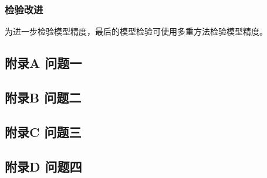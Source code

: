 \documentclass[a4paper, 12pt]{article}
\numberwithin{equation}{section}
\begin{document}
            \subsubsection{检验改进}
                为进一步检验模型精度，最后的模型检验可使用多重方法检验模型精度。


    {}
    \newpage


    {}
        \subsection*{附录A \hspace{2em} 问题一}
            

        \subsection*{附录B \hspace{2em} 问题二}
            

        \subsection*{附录C \hspace{2em} 问题三}
            

        \subsection*{附录D \hspace{2em} 问题四}
            
\end{document}
